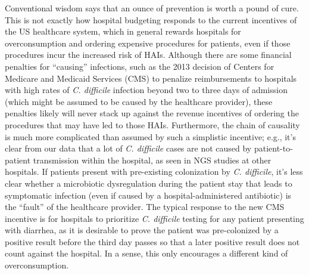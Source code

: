 Conventional wisdom says that an ounce of prevention is worth a pound of cure. This is not exactly how hospital budgeting responds to the current incentives of the US healthcare system, which in general rewards hospitals for overconsumption and ordering expensive procedures for patients, even if those procedures incur the increased risk of HAIs.\autocite{Lallemand2012,Gawande2015} Although there are some financial penalties for ``causing'' infections, such as the 2013 decision of Centers for Medicare and Medicaid Services (CMS) to penalize reimbursements to hospitals with high rates of \emph{C. difficile} infection beyond two to three days of admission (which might be assumed to be caused by the healthcare provider),\autocite{Drozd2015} these penalties likely will never stack up against the revenue incentives of ordering the procedures that may have led to those HAIs. Furthermore, the chain of causality is much more complicated than assumed by such a simplistic incentive; e.g., it's clear from our data that a lot of \emph{C. difficile} cases are not caused by patient-to-patient transmission within the hospital, as seen in NGS studies at other hospitals.\autocite{Eyre2013,Didelot2012a,Roach2015} If patients present with pre-existing colonization by \emph{C. difficile}, it's less clear whether a microbiotic dysregulation during the patient stay that leads to symptomatic infection (even if caused by a hospital-administered antibiotic) is the ``fault'' of the healthcare provider. The typical response to the new CMS incentive is for hospitals to prioritize \emph{C. difficile} testing for any patient presenting with diarrhea, as it is desirable to prove the patient was pre-colonized by a positive result before the third day passes so that a later positive result does not count against the hospital. In a sense, this only encourages a different kind of overconsumption.


